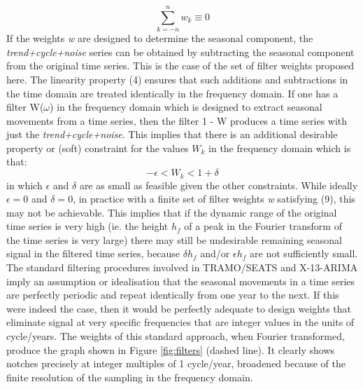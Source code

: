 \documentclass{article}
\begin{document}
\begin{equation}
\sum \limits_{k=-n}^n w_k \equiv 0
\end{equation}
If the weights \textit{w} are designed to determine the seasonal component, the \textit{trend+cycle+noise} series can be obtained by subtracting the seasonal component from the original time series. This is the case of the set of filter weights proposed  here. The linearity property (4) ensures that such additions and subtractions in the time domain are treated identically in the frequency domain. If one has a filter W($\omega$) in the frequency domain which is designed to extract seasonal movements from a time series, then the filter 1 - W produces a time series with just the \textit{trend+cycle+noise}. This implies that there is an additional desirable property or (soft) constraint for the values $W_k$ in the frequency domain which is that:
\begin{equation}
-\epsilon < W_k < 1+\delta
\end{equation}
in which $\epsilon$ and $\delta$ are as small as feasible given the other constraints. While ideally $\epsilon=0$ and $\delta=0$, in practice with a finite set of filter weights \textit{w} satisfying (9), this may not be achievable. This implies that if the dynamic range of the original time series is very high (ie. the height $h_f$ of a peak in the Fourier transform of the time series is very large) there may still be undesirable remaining seasonal signal in the filtered time series, because $\delta h_f$ and/or $\epsilon h_f$ are not sufficiently small.\\The standard filtering procedures involved in TRAMO/SEATS and X-13-ARIMA imply an assumption or idealisation that the seasonal movements in a time series are perfectly periodic and repeat identically from one year to the next. If this were indeed the case, then it would be perfectly adequate to design weights that eliminate signal at very specific frequencies that are integer values in the units of cycle/years. The weights of this standard approach, when Fourier transformed, produce the graph shown in Figure \ref{fig:filters} (dashed line). It clearly shows notches precisely at integer multiples of 1 cycle/year, broadened because of the finite resolution of the sampling in the frequency domain.\\
\end{document}
